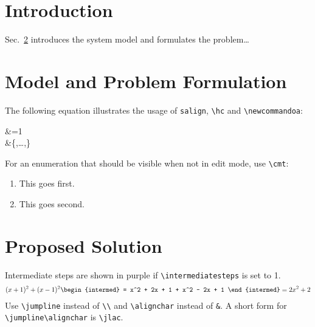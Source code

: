 \documentclass{article}
\begin{document}
\section{Introduction}
\begin{bullets}
    \blt[overview]
    \blt[motivation]
    \blt[contributions]
    Sec.~\ref{sec:model} introduces the system model and formulates the problem\ldots
    \blt[notation]
\end{bullets}

\section{Model and Problem Formulation}
\label{sec:model}

\begin{bullets}
    \blt[model]    The following equation illustrates the usage of \texttt{salign}, \texttt{\textbackslash hc} and \texttt{\textbackslash{}newcommandoa}:
    \begin{salign}[eq:globallabel]
        \label{eq:testequation}
        \testsymbol&=1\\
        \sectestsymbol &\in \{\sectestsymbol[0],\ldots,\sectestsymbol[N-1]\}
    \end{salign}

    For an enumeration that should be visible when not in edit mode, use \texttt{\textbackslash cmt}:
    \begin{enumerate}
        \item {} This goes first.
        \item {} This goes second.
    \end{enumerate}


\end{bullets}

\section{Proposed Solution}
\begin{bullets}%
    \blt[intermed] Intermediate steps are shown in purple if \texttt{\textbackslash intermediatesteps} is set to 1.
    \begin{align}
        (x+1)^2 + (x-1)^2
        \alignchar
        \begin{intermed}
            = x^2 + 2x + 1 + x^2 - 2x + 1
        \end{intermed}
        \jlac= 2x^2 + 2
    \end{align}
    Use \texttt{\textbackslash jumpline} instead of \texttt{\textbackslash\textbackslash} and  \texttt{\textbackslash alignchar} instead of \texttt{\&}. A short form for \texttt{\textbackslash jumpline\textbackslash alignchar} is \texttt{\textbackslash jlac}.
\end{bullets}%
\end{document}
